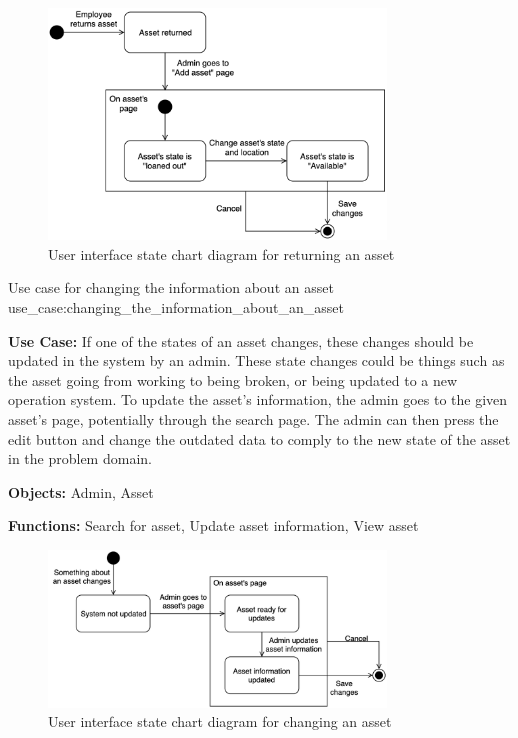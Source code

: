 \begin{figure}[H]
    \centering
    \includegraphics[width=0.8\textwidth]{figures/UC_Return_asset.png}
    \caption{User interface state chart diagram for returning an asset}
    \label{fig:return_asset_statechart}
\end{figure}

\newpage

    {Use case for changing the information about an asset}
    {use_case:changing_the_information_about_an_asset}
    {
        \textbf{Use Case:} If one of the states of an asset changes, these changes should be updated in the system by an admin. These state changes could be things such as the asset going from working to being broken, or being updated to a new operation system. To update the asset's information, the admin goes to the given asset's page, potentially through the search page. The admin can then press the edit button and change the outdated data to comply to the new state of the asset in the problem domain.
    
        \vskip 0.2cm
        
        \textbf{Objects:} Admin, Asset
        
        \vskip 0.2cm
        
        \textbf{Functions:} Search for asset, Update asset information, View asset
    }
    
\begin{figure}[H]
    \centering
    \includegraphics[width=0.8\textwidth]{figures/UC_Change_asset.png}
    \caption{User interface state chart diagram for changing an asset}
    \label{fig:edit_asset_statechart}
\end{figure}

